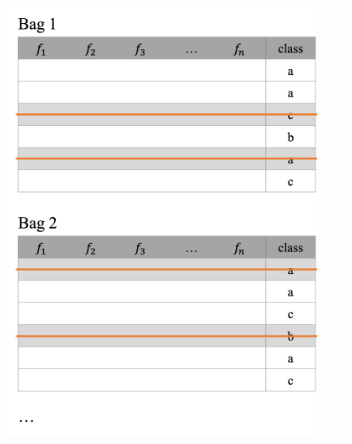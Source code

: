 \begin{figure}[h]
  \centering
  \begin{subfigure}{0.32\textwidth}
    \centering
    \includegraphics[width=0.9\textwidth]{assets/trees/id3/ensemble_instance_bagging.png}
    \textcolor{white}{\footnotesize test }
  \end{subfigure}
  \begin{subfigure}{0.32\textwidth}
    \centering

\end{subfigure}
\end{figure}

